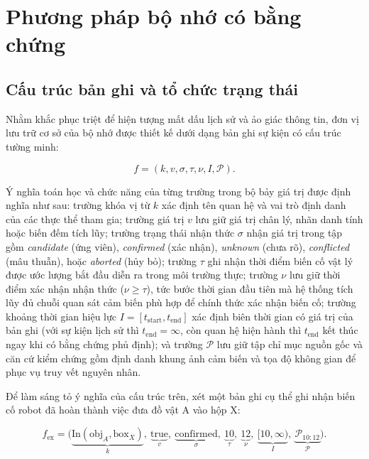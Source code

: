 \section{Phương pháp bộ nhớ có bằng chứng}

\subsection{Cấu trúc bản ghi và tổ chức trạng thái}

Nhằm khắc phục triệt để hiện tượng mất dấu lịch sử và ảo giác thông tin, đơn vị lưu trữ cơ sở của bộ nhớ được thiết kế dưới dạng bản ghi sự kiện có cấu trúc tường minh:

\begin{equation}
f = (k, v, \sigma, \tau, \nu, I, \mathcal P).
\label{eq:record-tuple}
\end{equation}

Ý nghĩa toán học và chức năng của từng trường trong bộ bảy giá trị được định nghĩa như sau: trường khóa vị từ $k$ xác định tên quan hệ và vai trò định danh của các thực thể tham gia; trường giá trị $v$ lưu giữ giá trị chân lý, nhãn danh tính hoặc biến đếm tích lũy; trường trạng thái nhận thức $\sigma$ nhận giá trị trong tập gồm \textit{candidate} (ứng viên), \textit{confirmed} (xác nhận), \textit{unknown} (chưa rõ), \textit{conflicted} (mâu thuẫn), hoặc \textit{aborted} (hủy bỏ); trường $\tau$ ghi nhận thời điểm biến cố vật lý được ước lượng bắt đầu diễn ra trong môi trường thực; trường $\nu$ lưu giữ thời điểm xác nhận nhận thức ($\nu \ge \tau$), tức bước thời gian đầu tiên mà hệ thống tích lũy đủ chuỗi quan sát cảm biến phù hợp để chính thức xác nhận biến cố; trường khoảng thời gian hiệu lực $I = [t_{\mathrm{start}}, t_{\mathrm{end}}]$ xác định biên thời gian có giá trị của bản ghi (với sự kiện lịch sử thì $t_{\mathrm{end}} = \infty$, còn quan hệ hiện hành thì $t_{\mathrm{end}}$ kết thúc ngay khi có bằng chứng phủ định); và trường $\mathcal P$ lưu giữ tập chỉ mục nguồn gốc và căn cứ kiểm chứng gồm định danh khung ảnh cảm biến và tọa độ không gian để phục vụ truy vết nguyên nhân.

Để làm sáng tỏ ý nghĩa của cấu trúc trên, xét một bản ghi cụ thể ghi nhận biến cố robot đã hoàn thành việc đưa đồ vật A vào hộp X:

\begin{equation}
f_{\mathrm{ex}} = \Big(\underbrace{\text{In}(\text{obj}_A, \text{box}_X)}_{k},\ \underbrace{\text{true}}_{v},\ \underbrace{\text{confirmed}}_{\sigma},\ \underbrace{10}_{\tau},\ \underbrace{12}_{\nu},\ \underbrace{[10, \infty)}_{I},\ \underbrace{\mathcal P_{10:12}}_{\mathcal P}\Big).
\label{eq:record-example}
\end{equation}


